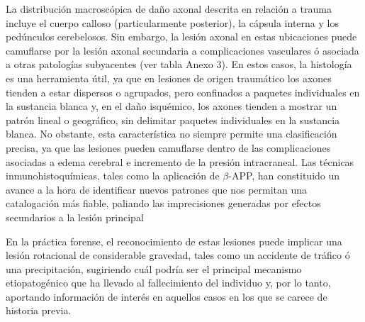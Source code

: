 La distribución macroscópica \cite{Reichard2005} de daño axonal descrita en relación a trauma incluye el cuerpo calloso (particularmente posterior), la cápsula interna y los pedúnculos cerebelosos. Sin embargo, la lesión axonal en estas ubicaciones puede camuflarse por la lesión axonal secundaria a complicaciones vasculares ó asociada a otras patologías subyacentes (ver tabla Anexo 3). En estos casos, la histología es una herramienta útil, ya que en lesiones de origen traumático los axones tienden a estar dispersos o agrupados, pero confinados a paquetes individuales en la sustancia blanca y, en el daño isquémico, los axones tienden a mostrar un patrón lineal o geográfico, sin delimitar paquetes individuales en la sustancia blanca. No obstante, esta característica no siempre permite una clasificación precisa, ya que las lesiones pueden camuflarse dentro de las complicaciones asociadas a edema cerebral e incremento de la presión intracraneal. Las técnicas inmunohistoquímicas, tales como la aplicación de $\beta$-APP, han constituido un avance a la hora de identificar nuevos patrones que nos permitan una catalogación más fiable, paliando las imprecisiones generadas por efectos secundarios a la lesión principal \cite{Geddes1997} \cite{Graham2004} \cite{Reichard2005} \cite{Traumatic}

En la práctica forense, el reconocimiento de estas lesiones puede implicar una lesión rotacional de considerable gravedad, tales como un accidente de tráfico ó una precipitación, sugiriendo cuál podría ser el principal mecanismo etiopatogénico que ha llevado al fallecimiento del individuo y, por lo tanto, aportando información de interés en aquellos casos en los que se carece de historia previa.

